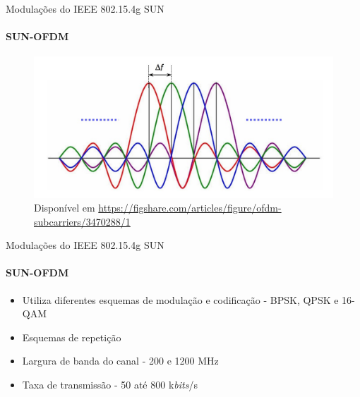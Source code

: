 \documentclass[c]{beamer}
\begin{document}
\begin{darkframes}
  \begin{frame}{Modulações do IEEE 802.15.4g SUN}
    \framesubtitle{SUN-OFDM}
    \begin{figure}
      \centering
      \includegraphics[width=\textwidth]{resources/ofdm.jpg}\\
      \footnotesize{Disponível em \url{https://figshare.com/articles/figure/ofdm-subcarriers/3470288/1}}
    \end{figure}
  \end{frame}

  \begin{frame}{Modulações do IEEE 802.15.4g SUN}
    \framesubtitle{SUN-OFDM}
    \begin{exampleblock}{
        \begin{itemize}
          \item Utiliza diferentes esquemas de modulação e codificação - BPSK, QPSK e 16-QAM
          \item Esquemas de repetição
          \item Largura de banda do canal - 200 e 1200 MHz
          \item Taxa de transmissão - 50 até 800 k\emph{bits}/s
        \end{itemize}}
    \end{exampleblock}
  \end{frame}


\end{darkframes}
\end{document}
